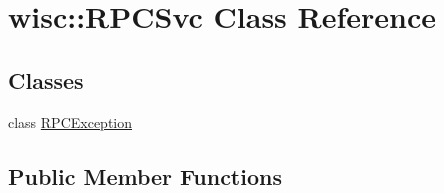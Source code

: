 \hypertarget{classwisc_1_1RPCSvc}{
\section{wisc::RPCSvc Class Reference}
\label{classwisc_1_1RPCSvc}
}
\subsection*{Classes}
\begin{DoxyCompactItemize}
\item 
class \hyperlink{classwisc_1_1RPCSvc_1_1RPCException}{RPCException}
\end{DoxyCompactItemize}
\subsection*{Public Member Functions}
